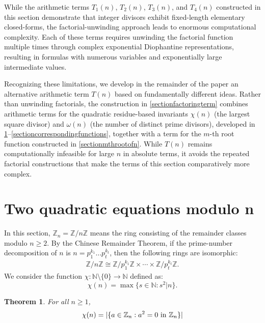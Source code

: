 \documentclass[10pt]{article}
\theoremstyle{plain}
\newtheorem{theorem}{Theorem}[section]
\newcommand{\Z}{\mathbb{Z}}
\begin{document}
While the arithmetic terms $T_1(n)$, $T_2(n)$, $T_3(n)$, and $T_4(n)$ constructed in this section demonstrate that integer divisors exhibit fixed-length elementary closed-forms, the factorial-unwinding approach leads to enormous computational complexity. Each of these terms requires unwinding the factorial function multiple times through complex exponential Diophantine representations, resulting in formulas with numerous variables and exponentially large intermediate values.

Recognizing these limitations, we develop in the remainder of the paper an alternative arithmetic term $T(n)$ based on fundamentally different ideas. Rather than unwinding factorials, the construction in \cref{sectionfactoringterm} combines arithmetic terms for the quadratic residue-based invariants $\chi(n)$ (the largest square divisor) and $\omega(n)$ (the number of distinct prime divisors), developed in \cref{sectiontwoquadratic}--\cref{sectioncorrespondingfunctions}, together with a term for the $m$-th root function constructed in \cref{sectionmthrootofn}. While $T(n)$ remains computationally infeasible for large $n$ in absolute terms, it avoids the repeated factorial constructions that make the terms of this section comparatively more complex.

\section{Two quadratic equations modulo n}\label{sectiontwoquadratic}

In this section, $\mathbb Z_n = \mathbb Z / n \mathbb Z$ means the ring consisting of the remainder classes modulo $n \geq 2$. By the Chinese Remainder Theorem, if the prime-number decomposition of $n$ is $n = p_1^{k_1}\dots p_t^{k_t}$, then the following rings are isomorphic:
\begin{align*}
\Z/n\Z \cong \Z/p_1^{k_1}\Z \times \cdots \times \Z/p_t^{k_t }\Z.
\end{align*}
We consider the function $\chi : \mathbb N \setminus\{0\} \rightarrow \mathbb N$ defined as:
$$\chi(n) = \max \{ s \in \mathbb N : s^2 | n \}.$$

\begin{theorem}\label{modeqchi}
    For all $n \geq 1$,
    $$\chi(n) = |\{ a \in \mathbb Z_n : a^2 = 0 \textup{  in } \mathbb Z_n \} |$$
\end{theorem}
\end{document}
